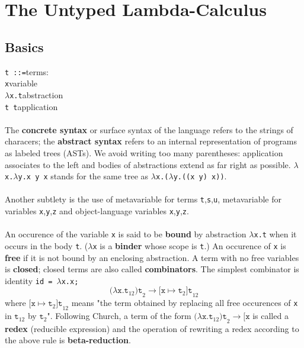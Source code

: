 \documentclass{article}
\begin{document}
\section{The Untyped Lambda-Calculus}
\subsection{Basics}
\texttt{t ::=}\tab\tab terms:\\
\null\qquad \texttt{x}\tab\tab variable\\
\null\qquad \(\lambda\)\texttt{x.t}\tab\tab abstraction\\
\null\qquad \texttt{t t}\tab\tab application\\\\
The \textbf{concrete syntax} or surface syntax of the language refers to the strings of characers; the \textbf{abstract syntax} refers to an internal representation of programs as labeled trees (ASTs).
We avoid writing too many parentheses: application associates to the left and bodies of abstractions extend as far right as possible. 
\(\lambda\)\texttt{x.}\(\lambda\)\texttt{y.x y x} stands for the same tree as \(\lambda\)\texttt{x.(}\(\lambda\)\texttt{y.((x y) x))}.\\\\
Another subtlety is the use of metavariable for terms \texttt{t},\texttt{s},\texttt{u}, metavariable for variables \texttt{x},\texttt{y},\texttt{z} and object-language variables \texttt{x},\texttt{y},\texttt{z}.\\\\
An occurence of the variable \texttt{x} is said to be \textbf{bound} by abstraction \(\lambda\)\texttt{x.t} when it occurs in the body \texttt{t}. (\(\lambda\)\texttt{x} is a \textbf{binder} whose scope is \texttt{t}.)
An occurence of \texttt{x} is \textbf{free} if it is not bound by an enclosing abstraction. A term with no free variables is \textbf{closed}; closed terms are also called \textbf{combinators}. The simplest combinator is identity \texttt{id = }\(\lambda\)\texttt{x.x;}
\[\texttt{(}\lambda \texttt{x.t}_{12}\texttt{)t}_{2}\to\texttt{[x}\mapsto \texttt{t}_{2}\texttt{]t}_{12}\]
where \(\texttt{[x}\mapsto \texttt{t}_{2}\texttt{]t}_{12}\) means "the term obtained by replacing all free occurences of \texttt{x} in \(\texttt{t}_{12}\) by \(\texttt{t}_{2}\)". Following Church, a term of the form \(\texttt{(}\lambda \texttt{x.t}_{12}\texttt{)t}_{2}\to\texttt{[x}\)
is called a \textbf{redex} (reducible expression) and the operation of rewriting a redex according to the above rule is \textbf{beta-reduction}.
\end{document}
